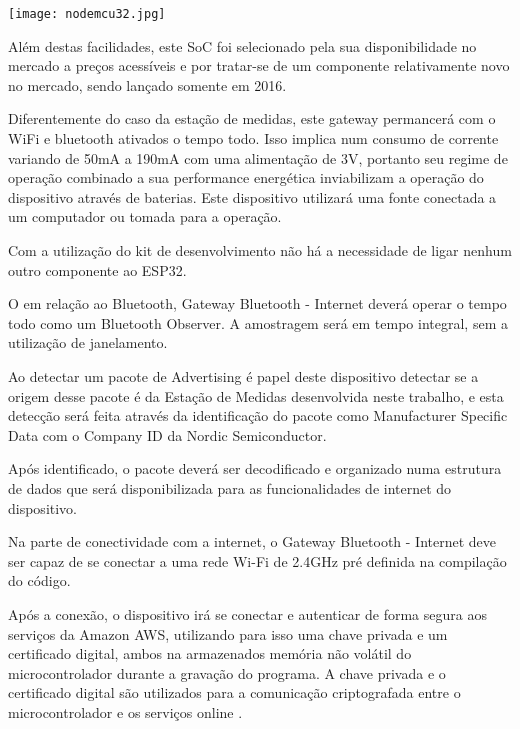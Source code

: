 \begin{center}
	\centering 
	\texttt{[image: nodemcu32.jpg]}
	\label{fig:nodemcu32}
\end{center} 

Além destas facilidades, este SoC foi selecionado pela sua disponibilidade no
mercado a preços acessíveis e por tratar-se de um componente relativamente
novo no mercado, sendo lançado somente em 2016\cite{ESP32Datasheet}. 

Diferentemente do caso da estação de medidas, este gateway permancerá com o WiFi
e bluetooth ativados o tempo todo. Isso implica num consumo de corrente variando
de 50mA a 190mA com uma alimentação de 3V\cite{ESP32Datasheet}, portanto seu
regime de operação combinado a sua performance energética inviabilizam a
operação do dispositivo através de baterias. Este dispositivo utilizará uma
fonte conectada a um computador ou tomada para a operação.

Com a utilização do kit de desenvolvimento não há a necessidade de ligar nenhum
outro componente ao ESP32.


O em relação ao Bluetooth, Gateway Bluetooth - Internet deverá operar o tempo
todo como um Bluetooth Observer. A amostragem será em tempo integral, sem a
utilização de janelamento.

Ao detectar um pacote de Advertising é papel deste dispositivo detectar se a
origem desse pacote é da Estação de Medidas desenvolvida neste trabalho, e esta
detecção será feita através da identificação do pacote como Manufacturer
Specific Data com o Company ID da Nordic Semiconductor. 

Após identificado, o pacote deverá ser decodificado e organizado numa estrutura
de dados que será disponibilizada para as funcionalidades de internet do
dispositivo.


Na parte de conectividade com a internet, o Gateway Bluetooth - Internet deve
ser capaz de se conectar a uma rede Wi-Fi de 2.4GHz pré definida na compilação
do código.

Após a conexão, o dispositivo irá se conectar e autenticar de forma segura aos
serviços da Amazon AWS, utilizando para isso uma chave privada e um certificado
digital, ambos na armazenados memória não volátil do microcontrolador durante a
gravação do programa. A chave privada e o certificado digital são utilizados
para a comunicação criptografada entre o microcontrolador e os serviços
online \cite{AWS_IoTCore}.

